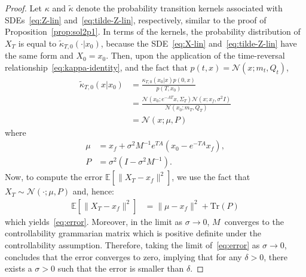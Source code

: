 \documentclass[letterpaper, 10 pt, conference]{ieeeconf}  %
\def\Expect{{\mathbb E}}
\newcommand{\trace}{\text{Tr}}
\newcommand{\ud}{\,\mathrm{d}}
\begin{document}
\begin{proof}
     Let $\kappa$ and $\tilde \kappa$ denote the probability transition kernels associated with SDEs~\eqref{eq:Z-lin} and~\eqref{eq:tilde-Z-lin}, respectively, similar to the proof of Proposition~\ref{prop:sol2p1}. In terms of the kernels, the probability distribution of $X_T$ is equal to $\tilde \kappa_{T,0}(\cdot|x_0)$, because the SDE~\eqref{eq:X-lin} and~\eqref{eq:tilde-Z-lin} have the same form and $X_0=x_0$.  Then, upon the application of the time-reversal relationship~\eqref{eq:kappa-identity}, and the fact that $p(t,x) = \mathcal N(x;m_t,Q_t)$,
\begin{align*}
    \tilde \kappa_{T,0}(x|x_0) &=  \frac{ \kappa_{T,0}(x_0|x)p(0,x)}{p(T,x_0)} \\
    & = \frac{\mathcal N(x_0;e^{-AT}x,\Sigma_T) \mathcal N(x;x_f,\sigma^2I)}{\mathcal N(x_0;m_T,Q_T)}\\&=\mathcal N(x;\mu,P)
\end{align*}
where 
\begin{align*}
    \mu &= x_f + \sigma^2 M^{-1}e^{TA}(x_0 - e^{-TA}x_f),\\
    P & =  \sigma^2(I- \sigma^2 M^{-1}).
\end{align*}
  Now, to compute the error   $\mathbb E[\|X_T-x_f\|^2]$, we use the fact that $X_T \sim \mathcal N(\cdot;\mu, P)$ and, hence: 
\begin{align}
    \mathbb E[\|X_T-x_f\|^2] &= \|\mu-x_f\|^2 + \trace(P) \nonumber
\end{align}
which yields~\eqref{eq:error}. Moreover, in the limit as $\sigma \to 0$, $M$~converges to the controllability grammarian matrix which is positive definite  under the controllability assumption.  Therefore, taking the limit of~\eqref{eq:error} as $\sigma \to 0$, concludes that the error converges to zero, implying that for any $\delta>0$, there exists a $\sigma>0$ such that the error is smaller than $\delta$. 
\end{proof}
\end{document}
